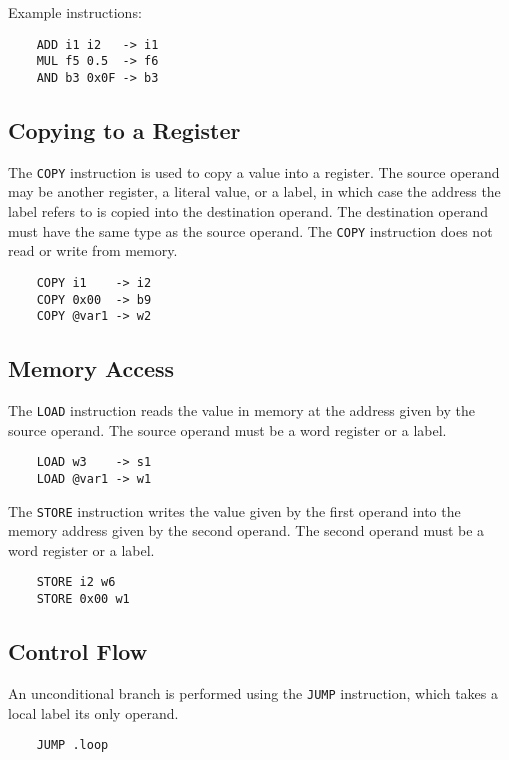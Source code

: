 Example instructions:

\begin{verbatim}
    ADD i1 i2   -> i1
    MUL f5 0.5  -> f6
    AND b3 0x0F -> b3
\end{verbatim}

\subsection{Copying to a Register}

The \texttt{COPY} instruction is used to copy a value into
a register. The source operand may be another register,
a literal value, or a label, in which case the address
the label refers to is copied into the destination operand.
The destination operand must have the same type as the source operand.
The \texttt{COPY} instruction does not read or write from memory.

\begin{verbatim}
    COPY i1    -> i2
    COPY 0x00  -> b9
    COPY @var1 -> w2
\end{verbatim}

\subsection{Memory Access}

The \texttt{LOAD} instruction reads the value in memory
at the address given by the source operand. The source operand
must be a word register or a label.

\begin{verbatim}
    LOAD w3    -> s1
    LOAD @var1 -> w1
\end{verbatim}

The \texttt{STORE} instruction writes the value given by
the first operand into the memory address given by the
second operand. The second operand must be a word register
or a label.

\begin{verbatim}
    STORE i2 w6
    STORE 0x00 w1
\end{verbatim}

\subsection{Control Flow}

An unconditional branch is performed using the \texttt{JUMP} instruction, which
takes a local label its only operand.

\begin{verbatim}
    JUMP .loop
\end{verbatim}

